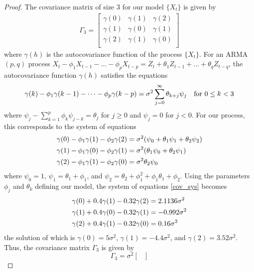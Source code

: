 \documentclass[12pt]{article}
\theoremstyle{definition}
\begin{document}
\begin{proof}
  The covariance matrix of size 3 for our model $\{X_t\}$ is given by
  \begin{align*}
    \Gamma_3 =
    \begin{bmatrix}
      \gamma(0) & \gamma(1) & \gamma(2) \\
      \gamma(1) & \gamma(0) & \gamma(1) \\
      \gamma(2) & \gamma(1) & \gamma(0) \\
    \end{bmatrix}
  \end{align*}
  where $\gamma(h)$ is the autocovariance function of the process $\{X_t\}$. For an ARMA$(p, q)$
  process $X_t -\phi_1 X_{t-1} - \dots - \phi_p X_{t-p} = Z_t + \theta_1 Z_{t-1} + \dots + \theta_q Z_{t-q}$,
  the autocovariance function $\gamma(h)$ satisfies the equations
  \[
    \gamma(k) - \phi_1 \gamma(k-1) - \dots - \phi_p \gamma(k-p) = \sigma^2 \sum_{j=0}^\infty \theta_{k+j}\psi_j \text{\quad for $0 \leq k < 3$}
  \]
  where $\psi_j - \sum_{k=1}^p \phi_k \psi_{j-k} = \theta_j$ for $j \geq 0$ and $\psi_j = 0$ for $j < 0$.
  For our process,  this corresponds to the system of equations
  \begin{align}\label{cov_sys}
    \gamma(0) - \phi_1 \gamma(1) - \phi_2 \gamma(2) &= \sigma^2 (\psi_0 + \theta_1\psi_1 + \theta_2\psi_2) \notag \\
    \gamma(1) - \phi_1 \gamma(0) - \phi_2 \gamma(1) &= \sigma^2 (\theta_1\psi_0 + \theta_2\psi_1) \\
    \gamma(2) - \phi_1 \gamma(1) - \phi_2 \gamma(0) &= \sigma^2 \theta_2\psi_0 \notag
  \end{align}
  where $\psi_0 = 1$, $\psi_1 = \theta_1 + \phi_1$, and $\psi_2 = \theta_2 + \phi_1^2 + \phi_1\theta_1 + \phi_2$.
  Using the parameters $\phi_j$ and $\theta_k$ defining our model, the system of equations \eqref{cov_sys} becomes
  \begin{align*}
    \gamma(0) + 0.4 \gamma(1) - 0.32 \gamma(2) &= 2.1136\sigma^2\\ \notag
    \gamma(1) + 0.4 \gamma(0) - 0.32 \gamma(1) &= -0.992 \sigma^2 \\
    \gamma(2) + 0.4 \gamma(1) - 0.32 \gamma(0) &= 0.16 \sigma^2 \notag
  \end{align*}
  the solution of which is $\gamma(0) = 5 \sigma^2$, $\gamma(1) = -4.4 \sigma^2$,
  and $\gamma(2) = 3.52 \sigma^2$. Thus, the covariance matrix $\Gamma_3$ is given by
  \[
    \Gamma_3 =
    \sigma^2
    \begin{bmatrix}

\end{bmatrix}\]
\end{proof}
\end{document}
